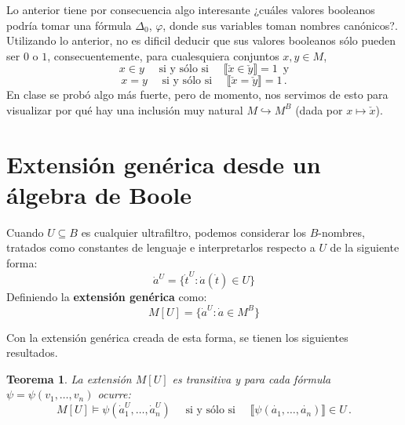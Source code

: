 \documentclass[letterpaper,DIV=15,12pt]{scrartcl}
\newtheorem{definicion}{Definición}
\newtheorem{teorema}{Teorema}
\newcommand{\tq}{:}
\newcommand{\sii}{\quad \text{ si y sólo si } \quad}
\newcommand{\Bv}[1]{\llbracket #1 \rrbracket}
\begin{document}
    Lo anterior tiene por consecuencia algo interesante ¿cuáles valores booleanos podría tomar una fórmula $\Delta_0$, $\varphi$, donde sus variables toman nombres canónicos?. Utilizando lo anterior, no es dificil deducir que sus valores booleanos sólo pueden ser $0$ o $1$, consecuentemente, para cualesquiera conjuntos $x,y \in M$,
    \[ x \in y \sii \Bv{\check{x} \in \check{y}} = 1 \, \text{ y} \]
    \[ x = y \sii \Bv{\check{x} = \check{y}} = 1 \, . \]
    En clase se probó algo más fuerte, pero de momento, nos servimos de esto para visualizar por qué hay una inclusión muy natural $M \hookrightarrow M^B$ (dada por $x \mapsto \check{x}$).
    

    \section*{Extensión genérica desde un álgebra de Boole}

    Cuando $U \subseteq B$ es cualquier ultrafiltro, podemos considerar los $B$-nombres, tratados como constantes de lenguaje e interpretarlos respecto a $U$ de la siguiente forma:
    \begin{equation}
        \dot{a}^U  = \{\dot{t}^U \tq \dot{a}(\dot{t}) \in U\}
    \end{equation}
    Definiendo la {\bfseries extensión genérica} como:
    \begin{equation}
        M[U]  = \{\dot{a}^U \tq \dot{a} \in M^B\}
    \end{equation}

    Con la extensión genérica creada de esta forma, se tienen los siguientes resultados.
    \begin{teorema}
        La extensión $M[U]$ es transitiva y para cada fórmula $\psi=\psi(v_1, \dots, v_n)$ ocurre:
        \[ M[U] \vDash \psi(\dot{a}^U_1 , \dots, \dot{a}^U _n) \sii \Bv{\psi(\dot{a_1}, \dots, \dot{a_n})} \in U \, . \]
    \end{teorema}
    
\end{document}
